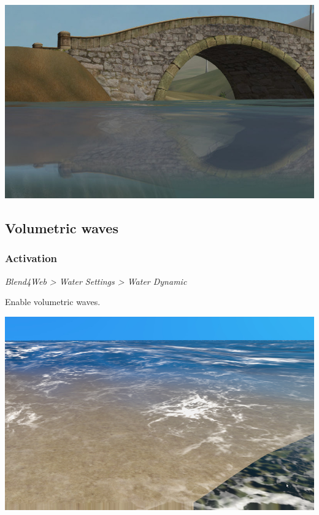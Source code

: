 \documentclass[a4paper,12pt,oneside]{sphinxmanual}
\begin{document}
{\hfill\includegraphics[width=1.000\linewidth]{water_border.jpg}\hfill}


\subsection{Volumetric waves}
\label{outdoor_rendering:id20}\label{outdoor_rendering:water-volumetric-waves}

\subsubsection{Activation}
\label{outdoor_rendering:id21}
\emph{Blend4Web \textgreater{} Water Settings \textgreater{} Water Dynamic}

Enable volumetric waves.

{\hfill\includegraphics[width=1.000\linewidth]{water_waves.jpg}\hfill}
\end{document}
